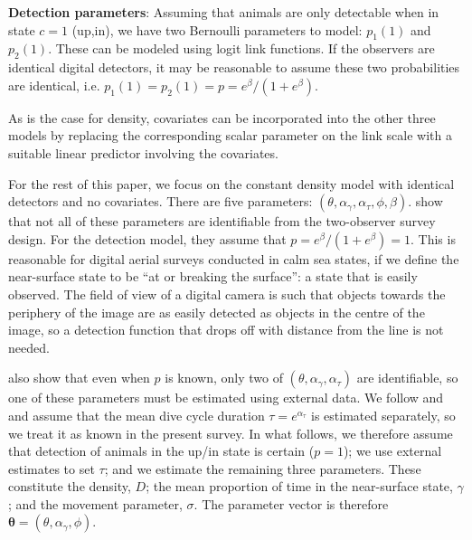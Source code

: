 \documentclass[useAMS, usenatbib, referee]{biom}\usepackage[]{graphicx}\usepackage[]{color}
\begin{document}
\textbf{Detection parameters}: Assuming that animals are only detectable when in state $c=1$ (up,in), we have two Bernoulli parameters to model: $p_1(1)$ and  $p_2(1)$. These can be modeled using logit link functions. If the observers are identical digital detectors, it may be reasonable to assume these two probabilities are identical, i.e. $p_1(1)=p_2(1)=p=e^\beta/(1+e^\beta)$.

As is the case for density, covariates can be incorporated into the other three models by replacing the corresponding scalar parameter on the link scale with a suitable linear predictor involving the covariates.


For the rest of this paper, we focus on the constant density model with identical detectors and no covariates. There are five parameters: $(\theta,\alpha_\gamma,\alpha_\tau, \phi, \beta)$. \cite{Stevenson+al:18} show that not all of these parameters are identifiable from the two-observer survey design. For the detection model, they assume that $p=e^\beta/(1+e^\beta)=1$. This is reasonable for digital aerial surveys conducted in calm sea states, if we define the near-surface state to be ``at or breaking the surface'': a state that is easily observed. The field of view of a digital camera is such that objects towards the periphery of the image are as easily detected as objects in the centre of the image, so a detection function that drops off with distance from the line is not needed.

\cite{Stevenson+al:18} also show that even when $p$ is known, only two of $(\theta,\alpha_\gamma,\alpha_\tau)$ are identifiable, so one of these parameters must be estimated using external data. We follow \cite{Stevenson+al:18} and \cite{Hiby+Lovell:98} and assume that the mean dive cycle duration $\tau=e^{\alpha_\tau}$ is estimated separately, so we treat it as known in the present survey. In what follows, we therefore assume that detection of animals in the up/in state is certain ($p=1$); we use external estimates to set $\tau$; and we estimate the remaining three parameters. These constitute the density, $D$; the mean proportion of time in the near-surface state, $\gamma$; and the movement parameter, $\sigma$. The parameter vector is therefore $\bm{\theta}=(\theta,\alpha_\gamma, \phi)$.

\end{document}
